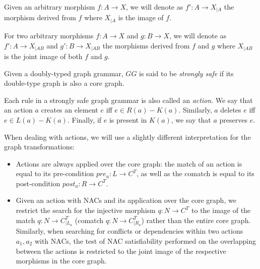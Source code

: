 \begin{notation} Given an arbitrary morphism $f : A \rightarrow X$, we will denote as $f' : A \rightarrow X_{|A}$ the morphism derived from $f$ where $X_{|A}$ is the image of $f$.

  For two arbitrary morphisms $f : A \rightarrow X$ and $g : B \rightarrow X$, we will denote as $f' : A \rightarrow X_{|AB}$ and $g' : B \rightarrow X_{|AB}$ the morphisms derived from $f$ and $g$ where $X_{|AB}$ is the joint image of both $f$ and $g$. 
\end{notation}

\begin{definition} Given \doublyTypedGraphGrammarCore{} a doubly-typed graph grammar, $GG$ is said to be \emph{strongly safe} if its double-type graph is also a core graph.

  Each rule in a strongly safe graph grammar is also called an \emph{action}. We say that an action $a$ creates an element $e$ iff $e \in R(a) - K(a)$. Similarly, $a$ deletes $e$ iff \mbox{$e \in L(a) - K(a)$}. Finally, if $e$ is present in $K(a)$, we say that $a$ preserves $e$. 

When dealing with actions, we will use a slightly different interpretation for the graph transformations: 
  
\begin{itemize} 
  \item Actions are always applied over the core graph: the match of an action is equal to its pre-condition $pre_a : L \rightarrow C^T$, as well as the comatch is equal to its post-condition $post_a : R \rightarrow C^T$.

  \item Given an action \action{} with NACs and its application over the core graph, we restrict the search for the injective morphism $q : N \rightarrow C^T$ to the image of the match $q : N \rightarrow C^T_{|L_a}$ (comatch $q : N \rightarrow C^T_{|R_a}$) rather than the entire core graph. Similarly, when searching for conflicts or dependencies within two actions $a_1, a_2$ with NACs, the test of NAC satisfiability performed on the overlapping between the actions is restricted to the joint image of the respective morphisms in the core graph.
\end{itemize}



\end{definition}
